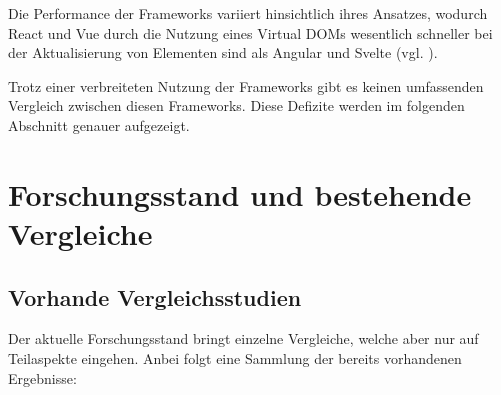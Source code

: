 \documentclass[oneside]{ausarbeitung}
\begin{document}
Die Performance der Frameworks variiert hinsichtlich ihres Ansatzes, wodurch React und Vue durch die Nutzung eines Virtual DOMs wesentlich schneller bei der Aktualisierung von Elementen sind als Angular und Svelte (vgl. \parencite[S. 61]{js-framework-comparison}).

Trotz einer verbreiteten Nutzung der Frameworks gibt es keinen umfassenden Vergleich zwischen diesen Frameworks. Diese Defizite werden im folgenden Abschnitt genauer aufgezeigt. 

\section{Forschungsstand und bestehende Vergleiche}
\subsection{Vorhande Vergleichsstudien}
Der aktuelle Forschungsstand bringt einzelne Vergleiche, welche aber nur auf Teilaspekte eingehen. Anbei folgt eine Sammlung der bereits vorhandenen Ergebnisse: 
\end{document}
